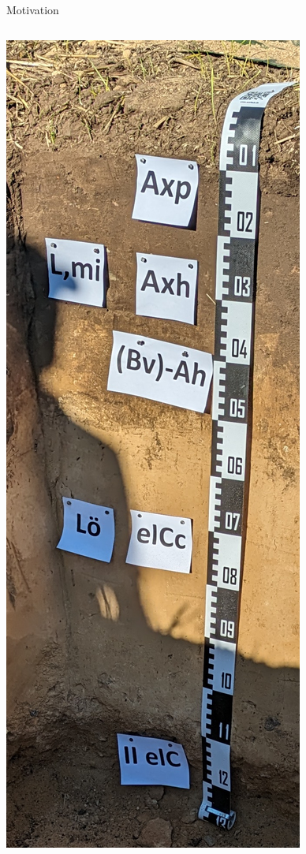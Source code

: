 \begin{frame}{Motivation}
\begin{columns}
\column{2.3cm}
\centering\includegraphics[width=1\textwidth]{FIGURE/Musterstueck.jpg} 


\end{columns}
\end{frame}
